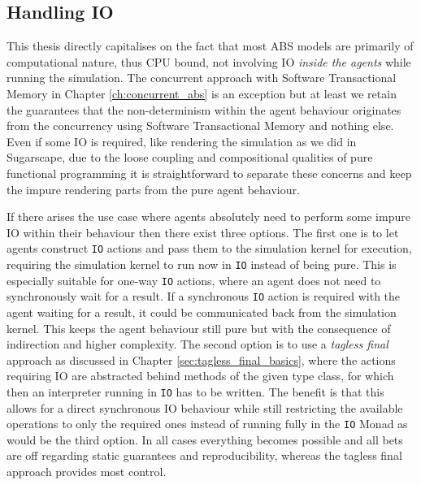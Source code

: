 \subsection{Handling IO}
This thesis directly capitalises on the fact that most ABS models are primarily of computational nature, thus CPU bound, not involving IO \textit{inside the agents} while running the simulation. The concurrent approach with Software Transactional Memory in Chapter \ref{ch:concurrent_abs} is an exception but at least we retain the guarantees that the non-determinism within the agent behaviour originates from the concurrency using Software Transactional Memory and nothing else. Even if some IO is required, like rendering the simulation as we did in Sugarscape, due to the loose coupling and compositional qualities of pure functional programming it is straightforward to separate these concerns and keep the impure rendering parts from the pure agent behaviour.

If there arises the use case where agents absolutely need to perform some impure IO within their behaviour then there exist three options. The first one is to let agents construct \texttt{IO} actions and pass them to the simulation kernel for execution, requiring the simulation kernel to run now in \texttt{IO} instead of being pure. This is especially suitable for one-way \texttt{IO} actions, where an agent does not need to synchronously wait for a result. If a synchronous \texttt{IO} action is required with the agent waiting for a result, it could be communicated back from the simulation kernel. This keeps the agent behaviour still pure but with the consequence of indirection and higher complexity. The second option is to use a \textit{tagless final} approach as discussed in Chapter \ref{sec:tagless_final_basics}, where the actions requiring IO are abstracted behind methods of the given type class, for which then an interpreter running in \texttt{IO} has to be written. The benefit is that this allows for a direct synchronous IO behaviour while still restricting the available operations to only the required ones instead of running fully in the \texttt{IO} Monad as would be the third option. In all cases everything becomes possible and all bets are off regarding static guarantees and reproducibility, whereas the tagless final approach provides most control.


